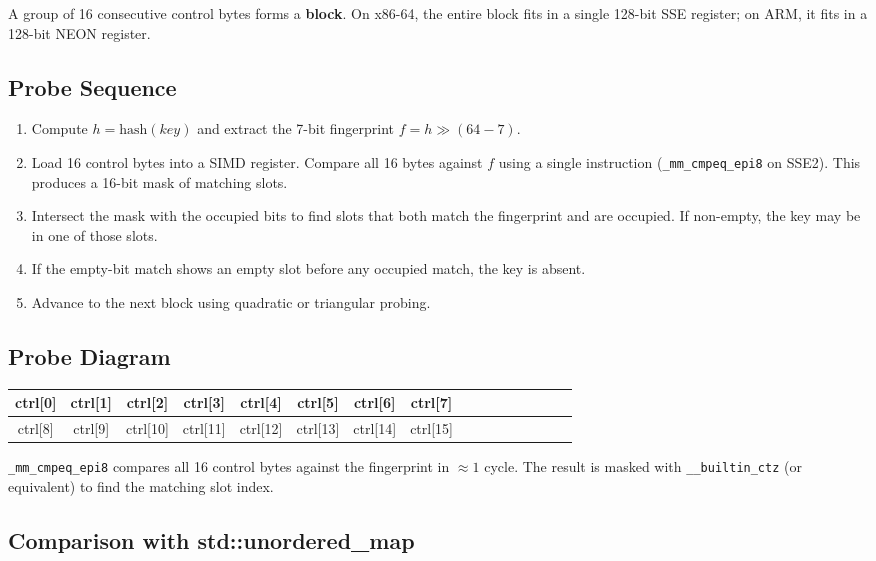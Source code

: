 A group of 16 consecutive control bytes forms a \textbf{block}. On x86-64, the entire block fits in a single 128-bit SSE register; on ARM, it fits in a 128-bit NEON register.

\subsection{Probe Sequence}

\begin{enumerate}
\item Compute $h = \text{hash}(key)$ and extract the 7-bit fingerprint $f = h \gg (64 - 7)$.
\item Load 16 control bytes into a SIMD register. Compare all 16 bytes against $f$ using a single instruction (\texttt{\_mm\_cmpeq\_epi8} on SSE2). This produces a 16-bit mask of matching slots.
\item Intersect the mask with the occupied bits to find slots that both match the fingerprint and are occupied. If non-empty, the key may be in one of those slots.
\item If the empty-bit match shows an empty slot before any occupied match, the key is absent.
\item Advance to the next block using quadratic or triangular probing.
\end{enumerate}

\subsection{Probe Diagram}

\begin{center}
\begin{tabular}{|c|c|c|c|c|c|c|c|c|c|c|c|c|c|c|c|}
\hline
ctrl[0] & ctrl[1] & ctrl[2] & ctrl[3] & ctrl[4] & ctrl[5] & ctrl[6] & ctrl[7] \\
\hline
ctrl[8] & ctrl[9] & ctrl[10] & ctrl[11] & ctrl[12] & ctrl[13] & ctrl[14] & ctrl[15] \\
\hline
\end{tabular}
\end{center}

\texttt{\_mm\_cmpeq\_epi8} compares all 16 control bytes against the fingerprint in $\approx 1$ cycle. The result is masked with \texttt{\_\_builtin\_ctz} (or equivalent) to find the matching slot index.

\subsection{Comparison with std::unordered\_map}

